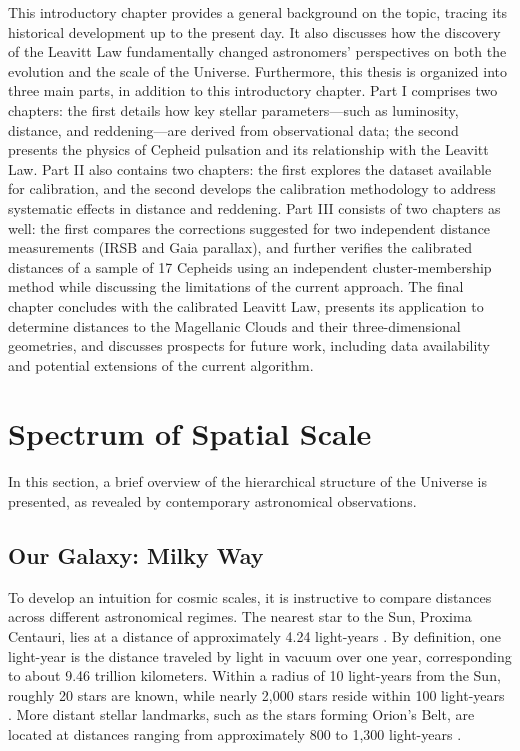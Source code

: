This introductory chapter provides a general background on the topic, tracing its historical development up to the present day. It also discusses how the discovery of the Leavitt Law fundamentally changed astronomers' perspectives on both the evolution and the scale of the Universe. Furthermore, this thesis is organized into three main parts, in addition to this introductory chapter. Part I comprises two chapters: the first details how key stellar parameters—such as luminosity, distance, and reddening—are derived from observational data; the second presents the physics of Cepheid pulsation and its relationship with the Leavitt Law. Part II also contains two chapters: the first explores the dataset available for calibration, and the second develops the calibration methodology to address systematic effects in distance and reddening. Part III consists of two chapters as well: the first compares the corrections suggested for two independent distance measurements (IRSB and Gaia parallax), and further verifies the calibrated distances of a sample of 17 Cepheids using an independent cluster-membership method while discussing the limitations of the current approach. The final chapter concludes with the calibrated Leavitt Law, presents its application to determine distances to the Magellanic Clouds and their three-dimensional geometries, and discusses prospects for future work, including data availability and potential extensions of the current algorithm.

\section{Spectrum of Spatial Scale}
In this section, a brief overview of the hierarchical structure of the Universe is presented, as revealed by contemporary astronomical observations. 



\subsection{Our Galaxy: Milky Way}


To develop an intuition for cosmic scales, it is instructive to compare distances across different astronomical regimes. The nearest star to the Sun, Proxima Centauri, lies at a distance of approximately 4.24 light-years \citep{Anglada2017}. By definition, one light-year is the distance traveled by light in vacuum over one year, corresponding to about 9.46 trillion kilometers. Within a radius of 10 light-years from the Sun, roughly 20 stars are known, while nearly 2,000 stars reside within 100 light-years \citep{Henry2018}. More distant stellar landmarks, such as the stars forming Orion's Belt, are located at distances ranging from approximately 800 to 1,300 light-years \citep{Bailer-Jones2018}.

